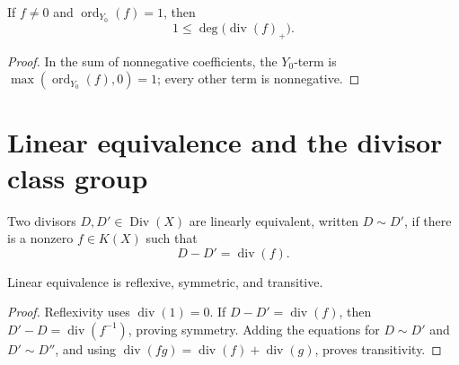 \begin{lemma}
  \label{lem:one_le_degree_positivePart_principal_of_order_one}
  \leanok

  If \(f\neq0\) and \(\operatorname{ord}_{Y_0}(f)=1\), then
  \[
    1\leq\deg\bigl(\operatorname{div}(f)_+\bigr).
  \]
\end{lemma}
\begin{proof}
  \leanok
  In the sum of nonnegative coefficients, the \(Y_0\)-term is
  \(\max(\operatorname{ord}_{Y_0}(f),0)=1\); every other term is
  nonnegative.
\end{proof}

\section{Linear equivalence and the divisor class group}

\begin{definition}
  \label{def:linear_equivalence}
  \leanok

  Two divisors \(D,D'\in\operatorname{Div}(X)\) are linearly equivalent,
  written \(D\sim D'\), if there is a nonzero \(f\in K(X)\) such that
  \[
    D-D'=\operatorname{div}(f).
  \]
\end{definition}

\begin{lemma}
  \label{lem:linear_equivalence_equivalence}
  Linear equivalence is reflexive, symmetric, and transitive.
\end{lemma}
\begin{proof}
  Reflexivity uses \(\operatorname{div}(1)=0\).  If
  \(D-D'=\operatorname{div}(f)\), then
  \(D'-D=\operatorname{div}(f^{-1})\), proving symmetry.  Adding the
  equations for \(D\sim D'\) and \(D'\sim D''\), and using
  \(\operatorname{div}(fg)=\operatorname{div}(f)+\operatorname{div}(g)\),
  proves transitivity.
\end{proof}

